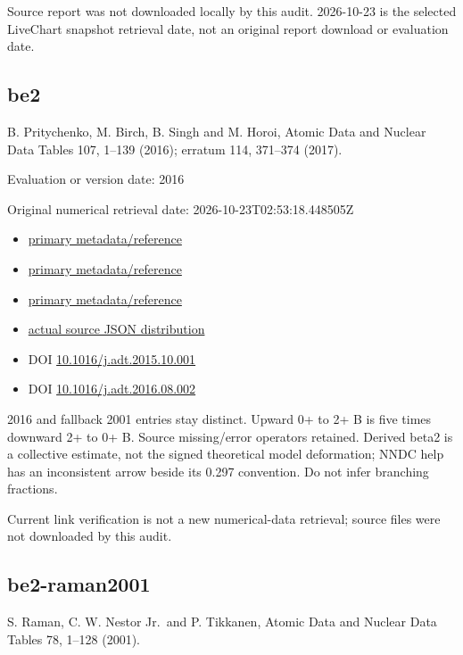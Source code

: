 \documentclass[
  11pt,
  letterpaper,
]{article}
\providecommand{\tightlist}{%
  \setlength{\itemsep}{0pt}\setlength{\parskip}{0pt}}
\begin{document}
Source report was not downloaded locally by this audit. 2026-10-23 is
the selected LiveChart snapshot retrieval date, not an original report
download or evaluation date.

\subsection{be2}\label{be2}

B. Pritychenko, M. Birch, B. Singh and M. Horoi, Atomic Data and Nuclear
Data Tables 107, 1--139 (2016); erratum 114, 371--374 (2017).

Evaluation or version date: 2016

Original numerical retrieval date: 2026-10-23T02:53:18.448505Z

\begin{itemize}
\tightlist
\item
  \href{https://www.nndc.bnl.gov/be2/}{primary metadata/reference}
\item
  \href{https://www.nndc.bnl.gov/be2/help.html}{primary
  metadata/reference}
\item
  \href{https://arxiv.org/abs/1312.5975}{primary metadata/reference}
\item
  \href{https://www.nndc.bnl.gov/be2/data/adopted-entries.json}{actual
  source JSON distribution}
\item
  DOI
  \href{https://doi.org/10.1016/j.adt.2015.10.001}{10.1016/j.adt.2015.10.001}
\item
  DOI
  \href{https://doi.org/10.1016/j.adt.2016.08.002}{10.1016/j.adt.2016.08.002}
\end{itemize}

2016 and fallback 2001 entries stay distinct. Upward 0+ to 2+ B is five
times downward 2+ to 0+ B. Source missing/error operators retained.
Derived beta2 is a collective estimate, not the signed theoretical model
deformation; NNDC help has an inconsistent arrow beside its 0.297
convention. Do not infer branching fractions.

Current link verification is not a new numerical-data retrieval; source
files were not downloaded by this audit.

\subsection{be2-raman2001}\label{be2-raman2001}

S. Raman, C. W. Nestor Jr.~and P. Tikkanen, Atomic Data and Nuclear Data
Tables 78, 1--128 (2001).
\end{document}
